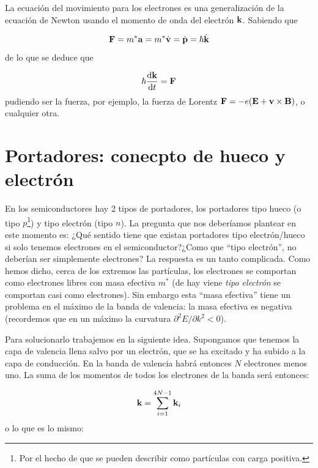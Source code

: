 La ecuación del movimiento para los electrones es una generalización de la ecuación de Newton usando el momento de onda del electrón $\mathbf{k}$. Sabiendo que

\begin{equation}
	\mathbf{F} = m^* \mathbf{a} = m^* \dot{\mathbf{v}} = \dot{\mathbf{p}} = \hbar\dot{\mathbf{k}}
\end{equation}
de lo que se deduce que

\begin{equation}
	\hbar \frac{\mathrm{d} \mathbf{k}}{\mathrm{d} t} = \mathbf{F}
\end{equation}
pudiendo ser la fuerza, por ejemplo, la fuerza de Lorentz $\mathbf{F}=-e(\mathbf{E}+\mathbf{v} \times \mathbf{B})$, o cualquier otra.

\section{Portadores: conecpto de hueco y electrón}

En los semiconductores hay 2 tipos de portadores, los portadores tipo hueco (o tipo $p$\footnote{Por el hecho de que se pueden describir como partículas con carga positiva.}) y tipo electrón (tipo $n$). La pregunta que nos deberíamos plantear en este momento es: ¿Qué sentido tiene que existan portadores tipo electrón/hueco si solo tenemos electrones en el semiconductor?¿Como que ``tipo electrón'', no deberían ser simplemente electrones? La respuesta es un tanto complicada. Como hemos dicho, cerca de los extremos las partículas, los electrones se comportan como electrones libres con masa efectiva $m^*$ (de hay viene \textit{tipo electrón} se comportan casi como electrones). Sin embargo esta ``masa efectiva'' tiene un problema en el máximo de la banda de valencia: la masa efectiva es negativa (recordemos que en un máximo la curvatura $\partial^2 E/ \partial k^2<0$). 

Para solucionarlo trabajemos en la siguiente idea. Supongamos que tenemos la capa de valencia llena salvo por un electrón, que se ha excitado y ha subido a la capa de conducción. En la banda de valencia habrá entonces $N$ electrones menos uno. La suma de los momentos de todos los electrones de la banda será entonces:

\begin{equation}
	\mathbf{k} = \sum_{i=1}^{4N-1} \mathbf{k}_i
\end{equation}
o lo que es lo mismo:

